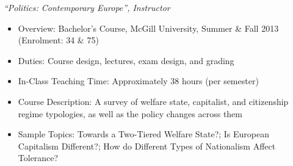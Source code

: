 \documentclass[11pt]{article}
\begin{document}
		  \textit{“Politics: Contemporary Europe”, Instructor}
	      \begin{itemize}[itemsep=0em, topsep=0em, partopsep=0em]
	      	\kern-\parskip\item Overview: Bachelor’s Course, McGill University, Summer \& Fall 2013 (Enrolment: 34 \& 75)
	      	\item Duties: Course design, lectures, exam design, and grading
	      	\item In-Class Teaching Time: Approximately 38 hours (per semester)
	      	\item Course Description: A survey of welfare state, capitalist, and citizenship regime typologies, as well as the policy changes across them
	      	\item Sample Topics: Towards a Two-Tiered Welfare State?; Is European Capitalism Different?; How do Different Types of Nationalism Affect Tolerance? 
	      \end{itemize}
\end{document}
